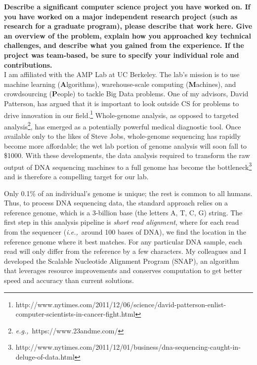 \documentclass{article}
\newcommand{\ie}{{\em i.e.,}~}
\newcommand{\eg}{{\em e.g.,}~}
\begin{document}
	
\pagestyle{plain}

\textbf{Describe a significant computer science project you have worked on. If you have worked on a major independent research project (such as research for a graduate program), please describe that work here. Give an overview of the problem, explain how you approached key technical challenges, and describe what you gained from the experience. If the project was team-based, be sure to specify your individual role and contributions.}\\

I am affiliated with the AMP Lab at UC Berkeley.
The lab's mission is to use machine learning (\textbf{A}lgorithms), warehouse-scale computing (\textbf{M}achines), and crowdsourcing (\textbf{P}eople) to tackle Big Data problems.
One of my advisors, David Patterson, has argued that it is important to look outside CS for problems to drive innovation in our field.\footnote{http://www.nytimes.com/2011/12/06/science/david-patterson-enlist-computer-scientists-in-cancer-fight.html} %
Whole-genome analysis, as opposed to targeted analysis\footnote{\eg https://www.23andme.com/}, has emerged as a potentially powerful medical diagnostic tool.
Once available only to the likes of Steve Jobs, whole-genome sequencing has rapidly become more affordable; the wet lab portion of genome analysis will soon fall to \$1000. %
With these developments, the data analysis required to transform the raw output of DNA sequencing machines to a full genome has become the bottleneck\footnote{http://www.nytimes.com/2011/12/01/business/dna-sequencing-caught-in-deluge-of-data.html} and is therefore a compelling target for our lab.

Only 0.1\% of an individual's genome is unique; the rest is common to all humans.
Thus, to process DNA sequencing data, the standard approach relies on a reference genome, which is a 3-billion base (the letters A, T, C, G) string.
The first step in this analysis pipeline is \textit{short read alignment}, where for each read from the sequencer (\ie around 100 bases of DNA), we find the location in the reference genome where it best matches.
For any particular DNA sample, each read will only differ from the reference by a few characters.
My colleagues and I developed the Scalable Nucleotide Alignment Program (SNAP), an algorithm that leverages resource improvements and conserves computation to get better speed and accuracy than current solutions.
\end{document}
